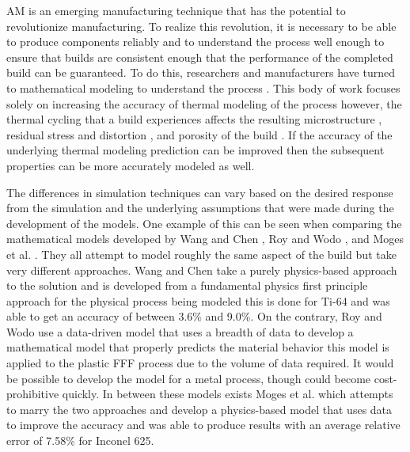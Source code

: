 \label{introAMsim}

\Acf{AM} is an emerging manufacturing technique that has the potential to revolutionize manufacturing.  To realize this revolution, it is necessary to be able to produce components reliably and to understand the process well enough to ensure that builds are consistent enough that the performance of the completed build can be guaranteed.  To do this, researchers and manufacturers have turned to mathematical modeling to understand the process \cite{neittaanmakiImpactScientificComputing2023}.
This body of work focuses solely on increasing the accuracy of thermal modeling of the process however, the thermal cycling that a build experiences affects the resulting microstructure \cite{qianSubrapidSolidificationStudy2020, weiMechanisticModelsAdditive2020, ansariSelectiveLaserMelting2022}, residual stress and distortion \cite{weiMechanisticModelsAdditive2020, ningAnalyticalModelingPart2020, promoppatumPartScaleEstimation2021}, and porosity of the build \cite{ningAnalyticalModelingPart2020a, wangPredictionLackoffusionPorosity2021, linProcessOptimizationDirected2020}.  If the accuracy of the underlying thermal modeling prediction can be improved then the subsequent properties can be more accurately modeled as well.

The differences in simulation techniques can vary based on the desired response from the simulation and the underlying assumptions that were made during the development of the models.
One example of this can be seen when comparing the mathematical models developed by Wang and Chen \cite{wangClosedLoopHighFidelitySimulation2021}, Roy and Wodo \cite{royDatadrivenModelingThermal2020}, and Moges et al. \cite{mogesHYBRIDMODELINGAPPROACH2020}.  They all attempt to model roughly the same aspect of the build but take very different approaches.
Wang and Chen \cite{wangClosedLoopHighFidelitySimulation2021} take a purely physics-based approach to the solution and is developed from a fundamental physics first principle approach for the physical process being modeled this is done for Ti-64 and was able to get an accuracy of between 3.6\% and 9.0\%.
On the contrary, Roy and Wodo \cite{royDatadrivenModelingThermal2020} use a data-driven model that uses a breadth of data to develop a mathematical model that properly predicts the material behavior this model is applied to the plastic \ac{FFF} process due to the volume of data required.  It would be possible to develop the model for a metal process, though could become cost-prohibitive quickly.
In between these models exists Moges et al. \cite{mogesHYBRIDMODELINGAPPROACH2020} which attempts to marry the two approaches and develop a physics-based model that uses data to improve the accuracy and was able to produce results with an average relative error of 7.58\% for Inconel 625.


